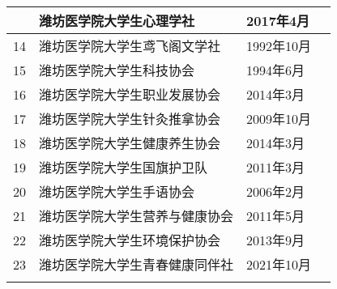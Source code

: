 \begin{center}
\begin{tabular}{|>{\centering\arraybackslash}p{2em}|>{\centering\arraybackslash}p{20em}|%
        >{\centering\arraybackslash}p{6em}|>{\centering\arraybackslash}p{5em}|}
        13 & 潍坊医学院大学生心理学社                  & 2017年4月  &                        \\
        \cline{1-3}
        14 & 潍坊医学院大学生鸢飞阁文学社                & 1992年10月 &                        \\
        \Xhline{1.2pt}
        15 & 潍坊医学院大学生科技协会                  & 1994年6月  & \multirow{2}{*}{创新创业类} \\
        \cline{1-3}
        16 & 潍坊医学院大学生职业发展协会                & 2014年3月  &                        \\
        \Xhline{1.2pt}
        17 & 潍坊医学院大学生针灸推拿协会                & 2009年10月 & \multirow{7}{*}{自律互助类} \\
        \cline{1-3}
        18 & 潍坊医学院大学生健康养生协会                & 2014年3月  &                        \\
        \cline{1-3}
        19 & 潍坊医学院大学生国旗护卫队                 & 2011年3月  &                        \\
        \cline{1-3}
        20 & 潍坊医学院大学生手语协会                  & 2006年2月  &                        \\
        \cline{1-3}
        21 & 潍坊医学院大学生营养与健康协会               & 2011年5月  &                        \\
        \cline{1-3}
        22 & 潍坊医学院大学生环境保护协会                & 2013年9月  &                        \\
        \cline{1-3}
        23 & 潍坊医学院大学生青春健康同伴社               & 2021年10月 &                        \\
        \Xhline{1.2pt}
    \end{tabular}
\end{center}

